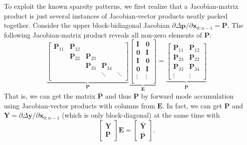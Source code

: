 \documentclass[preprint,12pt]{elsarticle}
\let\vec\bm
\let\mat\mathbf
\numberwithin{equation}{section}
\begin{document}
To exploit the known sparsity patterns, we first realize that a Jacobian-matrix product is just several instances of Jacobian-vector products neatly packed together.
Consider the upper block-bidiagonal Jacobian $\partial \Delta \vec{p} / \partial \vec{x}_{0:n-1} = \mat{P}$. The following Jacobian-matrix product reveals all non-zero elements of $\mat{P}$:
\begin{equation}
    \underbrace{
        \begin{bmatrix}
            \mat{P}_{11} & \mat{P}_{12} & \;     & \;     & \;     \\
            \;     & \mat{P}_{22} & \mat{P}_{23} & \;     & \;     \\
            \;     &        & \mat{P}_{33} & \mat{P}_{34} & \;     \\
            \;     & \;     & \;     & \ddots & \ddots \\
        \end{bmatrix}
    }_{\mat{P}}
    \underbrace{
        \begin{bmatrix}
            \mat{I}      & \mat{0}      \\
            \mat{0}      & \mat{I}      \\
            \mat{I}      & \mat{0}      \\
            \mat{0}      & \mat{I}      \\
            \vdots & \vdots \\
        \end{bmatrix}
    }_{\mat{E}}
    =
    \underbrace{
        \begin{bmatrix}
            \mat{P}_{11} & \mat{P}_{12} \\
            \mat{P}_{23} & \mat{P}_{22} \\
            \mat{P}_{33} & \mat{P}_{34} \\
            \vdots & \vdots
        \end{bmatrix}
    }_{\bar{\mat{P}}}
\end{equation}
That is, we can get the matrix $\bar{\mat{P}}$ and thus $\mat{P}$ by forward mode accumulation using Jacobian-vector products with columns from $\mat{E}$.
In fact, we can get $\mat{P}$ and $\mat{Y} = \partial \Delta \vec{y} / \partial \vec{x}_{0:n-1}$ (which is only block-diagonal) at the same time with
\begin{equation}
    \begin{bmatrix}
        \mat{Y} \\ \mat{P}
    \end{bmatrix}
    \mat{E}
    =
    \begin{bmatrix}
        \bar{\mat{Y}} \\ \bar{\mat{P}}
    \end{bmatrix}.
\end{equation}
\end{document}

